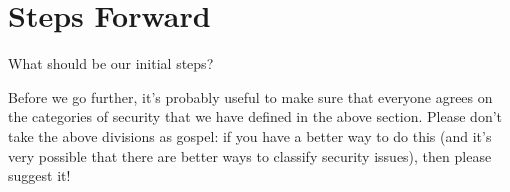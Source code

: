 \section{Steps Forward}
What should be our initial steps?  

\medskip

\noindent Before we go further, it's probably useful to make sure that everyone agrees on the categories of security that we have defined in the above section.  Please don't take the above divisions as gospel:  if you have a better way to do this (and it's very possible that there are better ways to classify security issues), then please suggest it!